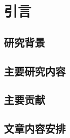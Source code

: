 \chapter{引言}
\label{cha:intro}



\section{研究背景}
\label{sec:background}

\section{主要研究内容}
\label{sec:work}

\section{主要贡献}
\label{sec:contribution}

\section{文章内容安排}
\label{sec:contribution}

